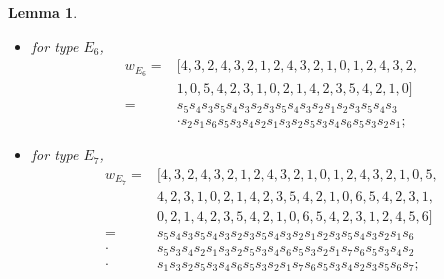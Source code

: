 \documentclass[reqno,12pt]{amsart}
\numberwithin{equation}{section}
\theoremstyle{plain}
\newtheorem{Lem}[Thm]{Lemma}
\theoremstyle{definition}
\begin{document}
\begin{Lem}
\begin{itemize}
        \item for type $E_6$,
        \begin{align*}
 w_{E_{6}}=&[4,3,2,4,3,2,1,2,4,3,2,1,0,1,2,4,3,2,\\
 &1,0,5,4,2,3,1,0,2,1,4,2,3,5,4,2,1,0] \\
=&s_5s_{4}s_{3}s_5s_{4}s_{3}s_2 s_{3}s_5s_{4}s_{3} s_2s_1s_2 s_{3}s_5s_{4}s_3 \\
& \cdot 
s_2s_{1}s_6s_5s_3s_4s_2s_1s_3s_2s_5s_3s_4s_6s_5s_3s_2s_1;
        \end{align*}
     \item for type $E_7$,
     \begin{align*}
w_{E_{7}}
=&[4,3,2,4,3,2,1,2,4,3,2,1,0,1,2,4,3,2,1,0,5,\\
 &4,2,3,1,0,2,1,4,2,3,5,4,2,1,0,6, 5, 4, 2, 3, 1,\\
 & 0, 2, 1, 4, 2, 3, 5, 4, 2, 1, 0, 6, 5, 4, 2, 3, 1, 2, 4, 5, 6] \\
=&s_5s_{4}s_{3}s_5s_{4}s_{3}s_2 s_{3}s_5s_{4}s_{3} s_2s_1s_2 s_{3}s_5s_{4}s_3 
s_2s_{1}s_6\\
 \cdot & s_5s_3s_4s_2s_1s_3s_2s_5s_3s_4s_6s_5s_3s_2s_1 s_7s_6s_5s_3s_4s_2\\
 \cdot & s_1s_3s_2s_5s_3s_4s_6s_5s_3s_2s_1s_7s_6s_5s_3s_4s_2s_3s_5s_6s_7;
        \end{align*}
        

\end{itemize}
\end{Lem}
\end{document}
